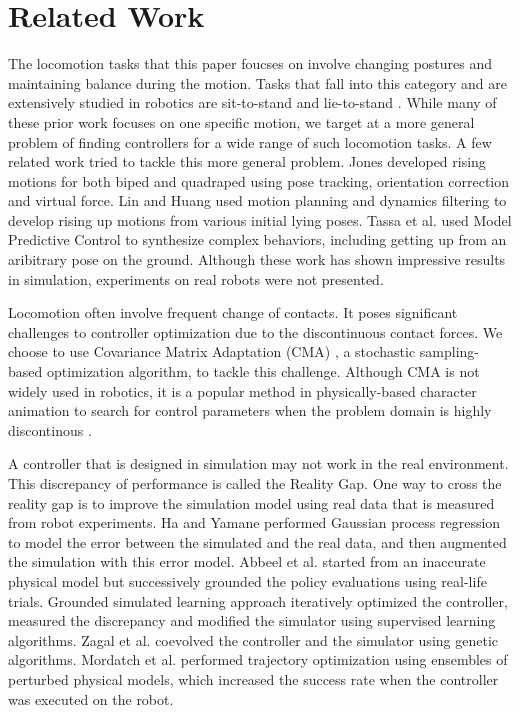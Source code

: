 \section{Related Work}
The locomotion tasks that this paper foucses on involve changing postures and maintaining balance during the motion. Tasks that fall into this category and are extensively studied in robotics are sit-to-stand \cite{Faloutsos:2003,Iida:2004,Pchelkin:2010,Mistry:2010} and lie-to-stand \cite{morimoto:1998,Faloutsos:2001,Hirukawa:2005,Kanehiro:2007}. While many of these prior work focuses on one specific motion, we target at a more general problem of finding controllers for a wide range of such locomotion tasks. A few related work tried to tackle this more general problem. Jones \cite{jones:2011} developed rising motions for both biped and quadraped using pose tracking, orientation correction and virtual force. Lin and Huang \cite{lin:2012} used motion planning and dynamics filtering to develop rising up motions from various initial lying poses. Tassa et al. \cite{tassa:2012} used Model Predictive Control to synthesize complex behaviors, including getting up from an aribitrary pose on the ground. Although these work has shown impressive results in simulation, experiments on real robots were not presented.

Locomotion often involve frequent change of contacts. It poses significant challenges to controller optimization due to the discontinuous contact forces. We choose to use Covariance Matrix Adaptation (CMA) \cite{Hansen:2009}, a stochastic sampling-based optimization algorithm, to tackle this challenge. Although CMA is not widely used in robotics, it is a popular method in physically-based character animation to search for control parameters when the problem domain is highly discontinous \cite{Wu:2010, Wang:2010, Tan:2014}.

A controller that is designed in simulation may not work in the real environment. This discrepancy of performance is called the Reality Gap. One way to cross the reality gap is to improve the simulation model using real data that is measured from robot experiments. Ha and Yamane \cite{HA:2015} performed Gaussian process regression to model the error between the simulated and the real data, and then augmented the simulation with this error model. Abbeel et al. \cite{Abbeel:2006} started from an inaccurate physical model but successively grounded the policy evaluations using real-life trials. Grounded simulated learning approach \cite{Farchy:2013} iteratively optimized the controller, measured the discrepancy and modified the simulator using supervised learning algorithms. Zagal et al. \cite{zagal2004} coevolved the controller and the simulator using genetic algorithms. Mordatch et al. \cite{Mordatch:2015} performed trajectory optimization using ensembles of perturbed physical models, which increased the success rate when the controller was executed on the robot.

